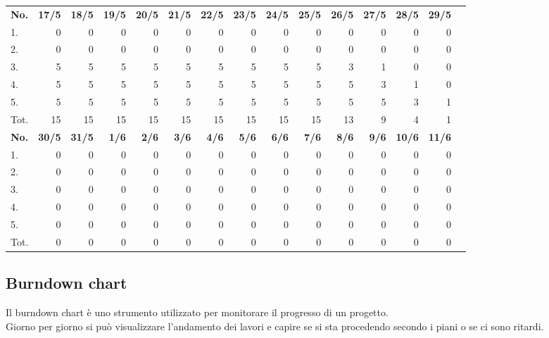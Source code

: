 \documentclass{article}
\begin{document}
\begin{table}[H]
    \centering
    \begin{tabularx}{\textwidth}{| X | r | r | r | r | r | r | r | r | r | r | r | r | r | r |}
        \Xhline{2pt}
        \textbf{No.} & \textbf{17/5} & \textbf{18/5} & \textbf{19/5} & \textbf{20/5} & \textbf{21/5} & \textbf{22/5} & \textbf{23/5} & \textbf{24/5} & \textbf{25/5} & \textbf{26/5} & \textbf{27/5} & \textbf{28/5} & \textbf{29/5} \\
        \Xhline{2pt}
        1. & 0 & 0 & 0 & 0 & 0 & 0 & 0 & 0 & 0 & 0 & 0 & 0 & 0 \\
        \hline
        2. & 0 & 0 & 0 & 0 & 0 & 0 & 0 & 0 & 0 & 0 & 0 & 0 & 0 \\
        \hline
        3. & 5 & 5 & 5 & 5 & 5 & 5 & 5 & 5 & 5 & 3 & 1 & 0 & 0 \\
        \hline
        4. & 5 & 5 & 5 & 5 & 5 & 5 & 5 & 5 & 5 & 5 & 3 & 1 & 0 \\
        \hline
        5. & 5 & 5 & 5 & 5 & 5 & 5 & 5 & 5 & 5 & 5 & 5 & 3 & 1 \\
        \hline
        Tot. & 15 & 15 & 15 & 15 & 15 & 15 & 15 & 15 & 15 & 13 & 9 & 4 & 1 \\
        \Xhline{2pt}
        \textbf{No.} & \textbf{30/5} & \textbf{31/5} & \textbf{ 1/6} & \textbf{ 2/6} & \textbf{ 3/6} & \textbf{ 4/6} & \textbf{ 5/6} & \textbf{ 6/6} & \textbf{ 7/6} & \textbf{ 8/6} & \textbf{ 9/6} & \textbf{10/6} & \textbf{11/6} \\
        \Xhline{2pt}
        1. & 0 & 0 & 0 & 0 & 0 & 0 & 0 & 0 & 0 & 0 & 0 & 0 & 0 \\
        \hline
        2. & 0 & 0 & 0 & 0 & 0 & 0 & 0 & 0 & 0 & 0 & 0 & 0 & 0 \\
        \hline
        3. & 0 & 0 & 0 & 0 & 0 & 0 & 0 & 0 & 0 & 0 & 0 & 0 & 0 \\
        \hline
        4. & 0 & 0 & 0 & 0 & 0 & 0 & 0 & 0 & 0 & 0 & 0 & 0 & 0 \\
        \hline
        5. & 0 & 0 & 0 & 0 & 0 & 0 & 0 & 0 & 0 & 0 & 0 & 0 & 0 \\
        \hline
        Tot. & 0 & 0 & 0 & 0 & 0 & 0 & 0 & 0 & 0 & 0 & 0 & 0 & 0 \\
        \hline
    \end{tabularx}
\end{table}

\clearpage

\subsection{Burndown chart}
Il burndown chart è uno strumento utilizzato per monitorare il progresso di un progetto.\\
Giorno per giorno si può visualizzare l'andamento dei lavori e capire se si sta procedendo secondo i piani o se ci sono ritardi.\\
\end{document}
